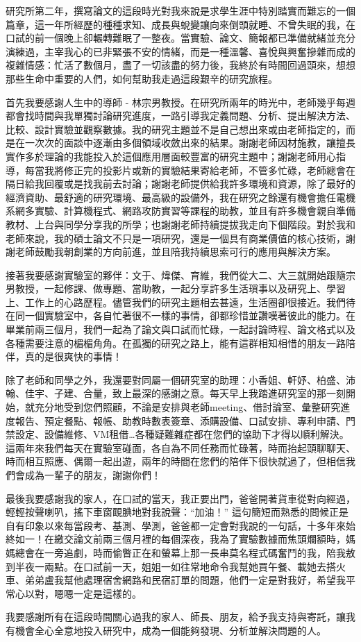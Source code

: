 \begin{acknowledgementszh}
研究所第二年，撰寫論文的這段時光對我來說是求學生涯中特別踏實而難忘的一個篇章，這一年所經歷的種種求知、成長與蛻變讓向來倒頭就睡、不曾失眠的我，在口試的前一個晚上卻輾轉難眠了一整夜。當實驗、論文、簡報都已準備就緒並充分演練過，主宰我心的已非緊張不安的情緒，而是一種溫馨、喜悅與興奮摻雜而成的複雜情感：忙活了數個月，盡了一切該盡的努力後，我終於有時間回過頭來，想想那些生命中重要的人們，如何幫助我走過這段艱辛的研究旅程。

首先我要感謝人生中的導師 - 林宗男教授。在研究所兩年的時光中，老師幾乎每週都會找時間與我單獨討論研究進度，一路引導我定義問題、分析、提出解決方法、比較、設計實驗並觀察數據。我的研究主題並不是自己想出來或由老師指定的，而是在一次次的面談中逐漸由多個領域收斂出來的結果。謝謝老師因材施教，讓擅長實作多於理論的我能投入於這個應用層面較豐富的研究主題中；謝謝老師用心指導，每當我將修正完的投影片或新的實驗結果寄給老師，不管多忙碌，老師總會在隔日給我回覆或是找我前去討論；謝謝老師提供給我許多環境和資源，除了最好的經濟資助、最舒適的研究環境、最高級的設備外，我在研究之餘還有機會擔任電機系網多實驗、計算機程式、網路攻防實習等課程的助教，並且有許多機會親自準備教材、上台與同學分享我的所學；也謝謝老師持續提拔我走向下個階段。對於我和老師來說，我的碩士論文不只是一項研究，還是一個具有商業價值的核心技術，謝謝老師鼓勵我朝創業的方向前進，並且陪我持續思索可行的應用與解決方案。

接著我要感謝實驗室的夥伴：文于、煒傑、育維，我們從大二、大三就開始跟隨宗男教授，一起修課、做專題、當助教，一起分享許多生活瑣事以及研究上、學習上、工作上的心路歷程。儘管我們的研究主題相去甚遠，生活圈卻很接近。我們待在同一個實驗室中，各自忙著很不一樣的事情，卻都珍惜並讚嘆著彼此的能力。在畢業前兩三個月，我們一起為了論文與口試而忙碌，一起討論時程、論文格式以及各種需要注意的楣楣角角。在孤獨的研究之路上，能有這群相知相惜的朋友一路陪伴，真的是很爽快的事情！

除了老師和同學之外，我還要對同屬一個研究室的助理：小香姐、軒妤、柏盛、沛翰、佳宇、子建、合量，致上最深的感謝之意。每天早上我踏進研究室的那一刻開始，就充分地受到您們照顧，不論是安排與老師meeting、借討論室、彙整研究進度報告、預定餐點、報帳、助教時數表簽章、添購設備、口試安排、專利申請、門禁設定、設備維修、VM租借\dots 各種疑難雜症都在您們的協助下才得以順利解決。這兩年來我們每天在實驗室碰面，各自為不同任務而忙碌著，時而抬起頭聊聊天、時而相互照應、偶爾一起出遊，兩年的時間在您們的陪伴下很快就過了，但相信我們會成為一輩子的朋友，謝謝你們！

最後我要感謝我的家人，在口試的當天，我正要出門，爸爸開著貨車從對向經過，輕輕按聲喇叭，搖下車窗靦腆地對我說聲：“加油！” 這句簡短而熟悉的問候正是自有印象以來每當段考、基測、學測，爸爸都一定會對我說的一句話，十多年來始終如一！在繳交論文前兩三個月裡的每個深夜，我為了實驗數據而焦頭爛額時，媽媽總會在一旁追劇，時而偷瞥正在和螢幕上那一長串莫名程式碼奮鬥的我，陪我敖到半夜一兩點。在口試前一天，姐姐一如往常地命令我幫她買午餐、載她去搭火車、弟弟盧我幫他處理宿舍網路和民宿訂單的問題，他們一定是對我好，希望我平常心以對，嗯嗯一定是這樣的。

我要感謝所有在這段時間關心過我的家人、師長、朋友，給予我支持與寄託，讓我有機會全心全意地投入研究中，成為一個能夠發現、分析並解決問題的人。
\end{acknowledgementszh}
